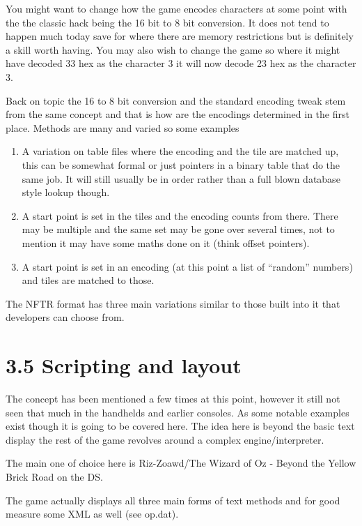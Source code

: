 \documentclass[
]{book}
\providecommand{\tightlist}{%
  \setlength{\itemsep}{0pt}\setlength{\parskip}{0pt}}
\begin{document}
You might want to change how the game encodes characters at some point with the the classic hack being the 16 bit to 8 bit conversion. It does not tend to happen much today save for where there are memory restrictions but is definitely a skill worth having. You may also wish to change the game so where it might have decoded 33 hex as the character 3 it will now decode 23 hex as the character 3.

Back on topic the 16 to 8 bit conversion and the standard encoding tweak stem from the same concept and that is how are the encodings determined in the first place. Methods are many and varied so some examples

\begin{enumerate}
\def\labelenumi{\arabic{enumi}.}
\tightlist
\item
  A variation on table files where the encoding and the tile are matched up, this can be somewhat formal or just pointers in a binary table that do the same job. It will still usually be in order rather than a full blown database style lookup though.
\item
  A start point is set in the tiles and the encoding counts from there. There may be multiple and the same set may be gone over several times, not to mention it may have some maths done on it (think offset pointers).
\item
  A start point is set in an encoding (at this point a list of ``random'' numbers) and tiles are matched to those.
\end{enumerate}

The NFTR format has three main variations similar to those built into it that developers can choose from.

\hypertarget{scripting-and-layout}{%
\section{3.5 Scripting and layout}\label{scripting-and-layout}}

The concept has been mentioned a few times at this point, however it still not seen that much in the handhelds and earlier consoles. As some notable examples exist though it is going to be covered here. The idea here is beyond the basic text display the rest of the game revolves around a complex engine/interpreter.

The main one of choice here is Riz-Zoawd/The Wizard of Oz - Beyond the Yellow Brick Road on the DS.

The game actually displays all three main forms of text methods and for good measure some XML as well (see op.dat).
\end{document}
